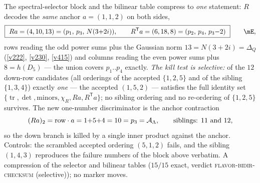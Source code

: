 \begin{keybox}
The spectral-selector block and the bilinear table compress to \emph{one} statement: $R$ decodes the
\emph{same} anchor $a=(1,1,2)$ on both sides,
\[
  \boxed{\ Ra=(4,10,13)=(p_1,\,p_3,\,N(3{+}2i)),\qquad
  R^{\mathsf T}a=(6,18,8)=(p_2,\,p_4,\,p_3{-}2)\ }\qquad\mE ,
\]
rows reading the odd power sums plus the Gaussian norm $13=N(3{+}2i)=\Delta_Q$ (\vref{v222},
\vref{v230}, \vref{v415}) and columns reading the even power sums plus $8=h(D_5)$ --- the union covers
$p_1..p_4$ exactly.  \emph{The kill test is selective:} of the $12$ down-row candidates (all orderings
of the accepted $\{1,2,5\}$ and of the sibling $\{1,3,4\}$) exactly \emph{one} --- the accepted
$(1,5,2)$ --- satisfies the full identity set $\{\operatorname{tr},\det,\text{minors},\chi_R,Ra,
R^{\mathsf T}a\}$; no sibling ordering and no re-ordering of $\{1,2,5\}$ survives.  The new
one-number discriminator is the anchor contraction
\[
  (Ra)_2=\text{row}\cdot a=1{+}5{+}4=10=p_3=\mathcal A_\Lambda,\qquad\text{siblings: }11\ \text{and}\ 12 ,
\]
so the down branch is killed by a single inner product against the anchor.  Controls: the scrambled
accepted ordering $(5,1,2)$ fails, and the sibling $(1,4,3)$ reproduces the failure numbers of the
block above verbatim.  A compression of the selector and bilinear tables ($15/15$ exact, verdict
\textsc{flavor-bidir-checksum} (selective)); no marker moves.
\end{keybox}

